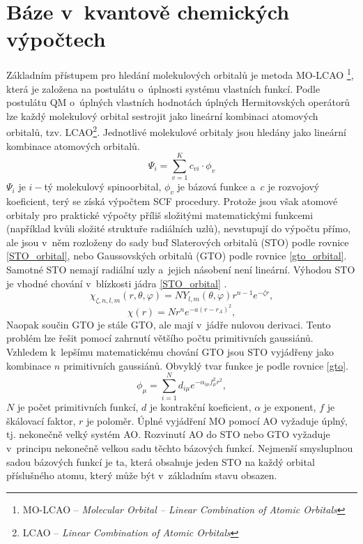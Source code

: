 \documentclass[
digital, %
table,   %
nolof,     %
nolot,     %
oneside,
]{fithesis3}
\begin{document}
\section{Báze v~kvantově chemických výpočtech}
Základním přístupem pro hledání molekulových orbitalů je metoda MO-LCAO \footnote{MO-LCAO -- \textit{Molecular Orbital – Linear Combination of Atomic Orbitals}}, která je založena na postulátu o~úplnosti systému vlastních funkcí. Podle postulátu QM o~úplných vlastních hodnotách úplných Hermitovských operátorů lze každý molekulový orbital sestrojit jako lineární kombinaci atomových orbitalů, tzv. LCAO\footnote{LCAO -- \textit{Linear Combination of Atomic Orbitals}}. Jednotlivé molekulové orbitaly jsou hledány jako lineární kombinace atomových orbitalů.
\begin{equation}
\Psi_i = \sum_{v=1}^{K}c_{vi} \cdot \phi_{v}
\end{equation}
$\Psi_i$ je $i-$tý molekulový spinoorbital, $\phi_{v}$ je bázová funkce a~$c$ je rozvojový koeficient, terý se získá výpočtem SCF procedury. Protože jsou však atomové orbitaly pro praktické výpočty příliš složitými matematickými funkcemi (například kvůli složité struktuře radiálních uzlů), nevstupují do výpočtu přímo, ale jsou v~něm rozloženy do sady buď Slaterových orbitalů (STO) podle rovnice \ref{STO_orbital}, nebo Gaussovských orbitalů (GTO) podle rovnice \ref{gto_orbital}. Samotné STO nemají radiální uzly a~jejich násobení není lineární. Výhodou STO je vhodné chování v~blízkosti jádra \ref{STO_orbital} \cite{jensen2007introduction}.
\begin{equation}
\chi_{\zeta, n, l, m}(r, \theta, \varphi) = NY_{l,m} (\theta, \varphi) r^{n-1} e^{-\zeta r},
\label{STO_orbital}
\end{equation}
\begin{equation}
\chi(r) = Nr^n e^{-a(r-r_A)^2},
\label{gto_orbital}
\end{equation}
Naopak součin GTO je stále GTO, ale mají v~jádře nulovou derivaci. Tento problém lze řešit pomocí zahrnutí většího počtu primitivních gaussiánů. Vzhledem k~lepšímu matematickému chování GTO jsou STO vyjádřeny jako kombinace $n$ primitivních gaussiánů. Obvyklý tvar funkce je podle rovnice \ref{gto}.
\begin{equation}
\phi_\mu = \sum_{i=1}^{N}d_{i\mu}e^{-\alpha_{i\mu}f^2_{\mu}r^2},
\label{gto}
\end{equation}
$N$ je počet primitivních funkcí, $d$ je kontrakční koeficient, $\alpha$ je exponent, $f$ je škálovací faktor, $r$ je poloměr. Úplné vyjádření MO pomocí AO vyžaduje úplný, tj. nekonečně velký systém AO. Rozvinutí AO do STO nebo GTO vyžaduje v~principu nekonečně velkou sadu těchto bázových funkcí. Nejmenší smysluplnou sadou bázových funkcí je ta, která obsahuje jeden STO na každý orbital příslušného atomu, který může být v~základním stavu obsazen.
\end{document}
